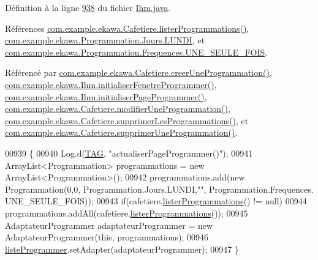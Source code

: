 Définition à la ligne \hyperlink{_ihm_8java_source_l00938}{938} du fichier \hyperlink{_ihm_8java_source}{Ihm.\+java}.



Références \hyperlink{_cafetiere_8java_source_l00846}{com.\+example.\+ekawa.\+Cafetiere.\+lister\+Programmations()}, \hyperlink{_programmation_8java_source_l00039}{com.\+example.\+ekawa.\+Programmation.\+Jours.\+L\+U\+N\+DI}, et \hyperlink{_programmation_8java_source_l00062}{com.\+example.\+ekawa.\+Programmation.\+Frequences.\+U\+N\+E\+\_\+\+S\+E\+U\+L\+E\+\_\+\+F\+O\+IS}.



Référencé par \hyperlink{_cafetiere_8java_source_l00731}{com.\+example.\+ekawa.\+Cafetiere.\+creer\+Une\+Programmation()}, \hyperlink{_ihm_8java_source_l00727}{com.\+example.\+ekawa.\+Ihm.\+initialiser\+Fenetre\+Programmer()}, \hyperlink{_ihm_8java_source_l00668}{com.\+example.\+ekawa.\+Ihm.\+initialiser\+Page\+Programmer()}, \hyperlink{_cafetiere_8java_source_l00775}{com.\+example.\+ekawa.\+Cafetiere.\+modifier\+Une\+Programmation()}, \hyperlink{_cafetiere_8java_source_l00834}{com.\+example.\+ekawa.\+Cafetiere.\+supprimer\+Les\+Programmations()}, et \hyperlink{_cafetiere_8java_source_l00820}{com.\+example.\+ekawa.\+Cafetiere.\+supprimer\+Une\+Programmation()}.


\begin{DoxyCode}
00939     \{
00940         Log.d(\hyperlink{classcom_1_1example_1_1ekawa_1_1_ihm_a95cd92c2acaf9f8982302da08d94f9aa}{TAG}, \textcolor{stringliteral}{"actualiserPageProgrammer()"});
00941         ArrayList<Programmation> programmations = \textcolor{keyword}{new} ArrayList<Programmation>();
00942         programmations.add(\textcolor{keyword}{new} Programmation(0,0, Programmation.Jours.LUNDI,\textcolor{stringliteral}{""}, Programmation.Frequences.
      UNE\_SEULE\_FOIS));
00943         \textcolor{keywordflow}{if}(cafetiere.\hyperlink{classcom_1_1example_1_1ekawa_1_1_cafetiere_af82120eee3f2f7dbb28f74e663bfe15a}{listerProgrammations}() != null)
00944             programmations.addAll(cafetiere.\hyperlink{classcom_1_1example_1_1ekawa_1_1_cafetiere_af82120eee3f2f7dbb28f74e663bfe15a}{listerProgrammations}());
00945         AdaptateurProgrammer adaptateurProgrammer = \textcolor{keyword}{new} AdaptateurProgrammer(\textcolor{keyword}{this}, programmations);
00946         \hyperlink{classcom_1_1example_1_1ekawa_1_1_ihm_a4fd152e506a6b1130477795d8c2d2a83}{listeProgrammer}.setAdapter(adaptateurProgrammer);
00947     \}
\end{DoxyCode}
\mbox{\label{classcom_1_1example_1_1ekawa_1_1_ihm_a2d7fd2fe397785acc2b9a32e65cfd52f}} 
